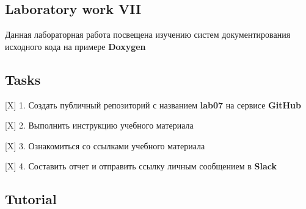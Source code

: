 \href{https://travis-ci.org/Kustov-Ilya/lab07}{\tt } \subsection*{Laboratory work V\+II}

Данная лабораторная работа посвещена изучению систем документирования исходного кода на примере {\bfseries Doxygen}




\subsection*{Tasks}


\begin{DoxyItemize}
\item \mbox{[}X\mbox{]} 1. Создать публичный репозиторий с названием {\bfseries lab07} на сервисе {\bfseries Git\+Hub}
\item \mbox{[}X\mbox{]} 2. Выполнить инструкцию учебного материала
\item \mbox{[}X\mbox{]} 3. Ознакомиться со ссылками учебного материала
\item \mbox{[}X\mbox{]} 4. Составить отчет и отправить ссылку личным сообщением в {\bfseries Slack}
\end{DoxyItemize}

\subsection*{Tutorial}

